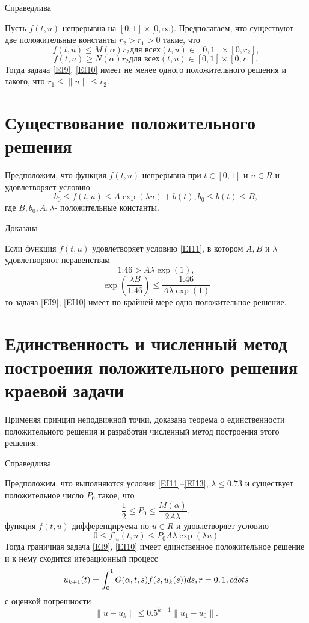 Справедлива
\begin{theoremA}
Пусть $f(t,u)$ непрерывна на
$[0,1]\times[0,\infty)$. Предполагаем, что существуют две
положительные константы $r_2>r_1>0$ такие, что
$$
f(t,u)\leq M(\alpha)r_2 \text{для всех} (t,u) \in [0,1]\times
[0,r_2],
$$
$$
f(t,u)\geq N(\alpha)r_2 \text{для всех} (t,u) \in [0,1]\times
[0,r_1],
$$
Тогда задача \eqref{EI9}, \eqref{EI10} имеет не менее одного положительного решения
и такого, что $r_1\leq \|u \| \leq r_2$.
\end{theoremA}

\section{Существование положительного решения}

Предположим, что функция $f(t,u)$ непрерывна при $ t \in [0,1]$   и
$u \in R$ и удовлетворяет условию
\begin{equation}\label{EI11}
 b_0\leq f(t,u)\leq A\exp(\lambda u)+b(t), b_0\leq b(t)\leq B,
\end{equation}
где $B,b_0, A,\lambda $- положительные константы.

Доказана

\begin{theorem}\label{EItheo2}
Если функция $f(t,u)$ удовлетворяет условию \eqref{EI11}, в котором $A,B$ и $\lambda $
удовлетворяют неравенствам
\begin{equation}\label{EI12}
 1.46>A\lambda\exp(1),
\end{equation}
\begin{equation}\label{EI13}
 \exp\left(\frac{\lambda B}{1.46}\right )\leq
 \frac{1.46}{A\lambda\exp(1)}
\end{equation}
 то задача \eqref{EI9}, \eqref{EI10}  имеет по крайней мере одно положительное
 решение.
\end{theorem}
 
\section{Единственность и численный метод построения положительного решения краевой задачи }
Применяя принцип неподвижной точки, доказана теорема о
единственности положительного решения и разработан численный метод
построения этого решения.

Справедлива

\begin{theorem}\label{EItheo3}
Предположим, что выполняются условия \eqref{EI11}--\eqref{EI13}, $\lambda \leq 0.73 $ и существует  положительное число
$P_0$ такое, что
$$
\frac{1}{2}\leq P_0 \leq \frac{M(\alpha)}{2A\lambda },
$$
функция $ f(t,u)$  дифференцируема по $ u \in R $ и удовлетворяет
условию
$$
0\leq f'_u(t,u)\leq P_0 A\lambda \exp (\lambda u)
$$
Тогда граничная задача \eqref{EI9}, \eqref{EI10} имеет единственное положительное
решение и к нему сходится итерационный процесс
$$
u_{k+1}(t)=\int_0^1G(\alpha,t,s)f(s, u_k(s))ds, r=0,1,\\cdots
$$
с оценкой погрешности
$$
\|u-u_k\|\leq 0.5^{k-1}\|u_1-u_0\|.
$$
\end{theorem}